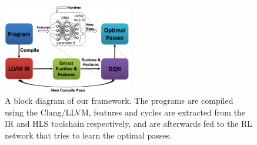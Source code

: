 \begin{figure}[h!]
    \centering
    \includegraphics[width=0.5\textwidth]{Figures/framework.png}
    \caption{A block diagram of our framework. The programs are compiled using the Clang/LLVM, features and cycles are extracted from the IR and HLS toolchain respectively, and are afterwards fed to the RL network that tries to learn the optimal passes.  \vspace*{-0.5cm}}
    \label{fig:framework}
\end{figure}
